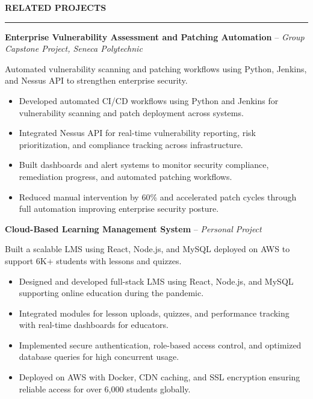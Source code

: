 \documentclass[10pt,letterpaper]{article}
\begin{document}
\vspace{6pt}

\textbf{RELATED PROJECTS}\\[-8pt]
\noindent\rule{\textwidth}{1pt}

\vspace{-2pt}

\textbf{Enterprise Vulnerability Assessment and Patching Automation} -- \emph{Group Capstone Project, Seneca Polytechnic }

\vspace{-1pt}

Automated vulnerability scanning and patching workflows using Python, Jenkins, and Nessus API to strengthen enterprise security.
\vspace{-1pt}
\begin{itemize}
\item Developed automated CI/CD workflows using Python and Jenkins for vulnerability scanning and patch deployment across systems.
\item Integrated Nessus API for real-time vulnerability reporting, risk prioritization, and compliance tracking across infrastructure.
\item Built dashboards and alert systems to monitor security compliance, remediation progress, and automated patching workflows.
\item Reduced manual intervention by 60\% and accelerated patch cycles through full automation improving enterprise security posture.
\end{itemize}

\textbf{Cloud-Based Learning Management System} -- \emph{Personal Project}

\vspace{-1pt}

Built a scalable LMS using React, Node.js, and MySQL deployed on AWS to support 6K+ students with lessons and quizzes.
\vspace{-1pt}
\begin{itemize}
\item Designed and developed full-stack LMS using React, Node.js, and MySQL supporting online education during the pandemic.
\item Integrated modules for lesson uploads, quizzes, and performance tracking with real-time dashboards for educators.
\item Implemented secure authentication, role-based access control, and optimized database queries for high concurrent usage.
\item Deployed on AWS with Docker, CDN caching, and SSL encryption ensuring reliable access for over 6,000 students globally.
\end{itemize}
\end{document}
